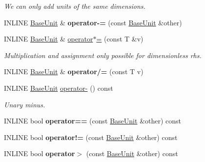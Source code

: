 \begin{DoxyCompactItemize}
\begin{DoxyCompactList}\small\item\em We can only add units of the same dimensions. \end{DoxyCompactList}\item 
\hypertarget{classBaseUnit_ae070f81a04b82f0d4b22f9e9f3b9badb}{}\label{classBaseUnit_ae070f81a04b82f0d4b22f9e9f3b9badb} 
I\+N\+L\+I\+NE \hyperlink{classBaseUnit}{Base\+Unit} \& {\bfseries operator-\/=} (const \hyperlink{classBaseUnit}{Base\+Unit} \&other)
\item 
\hypertarget{classBaseUnit_a668e6a85bf5a41e2d6645c62cd9d0cd0}{}\label{classBaseUnit_a668e6a85bf5a41e2d6645c62cd9d0cd0} 
I\+N\+L\+I\+NE \hyperlink{classBaseUnit}{Base\+Unit} \& \hyperlink{classBaseUnit_a668e6a85bf5a41e2d6645c62cd9d0cd0}{operator$\ast$=} (const T \&v)
\begin{DoxyCompactList}\small\item\em Multiplication and assignment only possible for dimensionless rhs. \end{DoxyCompactList}\item 
\hypertarget{classBaseUnit_a791337f8831c4984c93a677054403166}{}\label{classBaseUnit_a791337f8831c4984c93a677054403166} 
I\+N\+L\+I\+NE \hyperlink{classBaseUnit}{Base\+Unit} \& {\bfseries operator/=} (const T v)
\item 
\hypertarget{classBaseUnit_a567931f88fa903dae8bf06f6ecc4fc6b}{}\label{classBaseUnit_a567931f88fa903dae8bf06f6ecc4fc6b} 
I\+N\+L\+I\+NE \hyperlink{classBaseUnit}{Base\+Unit} \hyperlink{classBaseUnit_a567931f88fa903dae8bf06f6ecc4fc6b}{operator-\/} () const
\begin{DoxyCompactList}\small\item\em Unary minus. \end{DoxyCompactList}\item 
\hypertarget{classBaseUnit_a8079ffbd05ef2877eeb0592347c07402}{}\label{classBaseUnit_a8079ffbd05ef2877eeb0592347c07402} 
I\+N\+L\+I\+NE bool {\bfseries operator==} (const \hyperlink{classBaseUnit}{Base\+Unit} \&other) const
\item 
\hypertarget{classBaseUnit_a94e42920f08fd477da6291678671b104}{}\label{classBaseUnit_a94e42920f08fd477da6291678671b104} 
I\+N\+L\+I\+NE bool {\bfseries operator!=} (const \hyperlink{classBaseUnit}{Base\+Unit} \&other) const
\item 
\hypertarget{classBaseUnit_a0ae4822309584e832487d096f330f9f7}{}\label{classBaseUnit_a0ae4822309584e832487d096f330f9f7} 
I\+N\+L\+I\+NE bool {\bfseries operator$>$} (const \hyperlink{classBaseUnit}{Base\+Unit} \&other) const

\end{DoxyCompactItemize}
